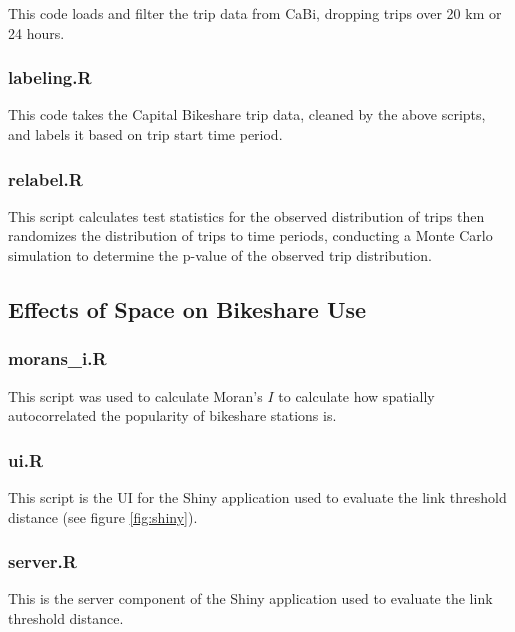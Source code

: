 \documentclass[letterpaper,11pt]{article}
\begin{document}
This code loads and filter the trip data from CaBi, dropping trips
over 20 km or 24 hours.



\subsubsection{labeling.R}
\label{labeling.R}

This code takes the Capital Bikeshare trip data, cleaned by the above
scripts, and labels it based on trip start time period.



\subsubsection{relabel.R}
\label{relabel.R}

This script calculates test statistics for the observed distribution
of trips then randomizes the distribution of trips to time periods,
conducting a Monte Carlo simulation to determine the p-value of the
observed trip distribution.



\subsection{Effects of Space on Bikeshare Use}
\subsubsection{morans\_i.R}
\label{morans_i.R}

This script was used to calculate Moran's $I$ to calculate how
spatially autocorrelated the popularity of bikeshare stations is.



\subsubsection{ui.R}
\label{ui.R}

This script is the UI for the Shiny application used to evaluate the
link threshold distance (see figure \ref{fig:shiny}).



\subsubsection{server.R}
\label{server.R}

This is the server component of the Shiny application used to evaluate
the link threshold distance.


\end{document}
